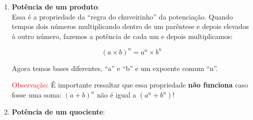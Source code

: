 \begin{enumerate}
    \begin{equation}
        a^{n^m}=(a^n)^m
    \end{equation}

    Representam a mesma coisa, mas nos diz uma ordem de execução, primeiro a potência de dentro do parêntese e depois a de fora. Continuando:

    \begin{equation}
        (a^n)^m=a^n.a^n.a^n.a^n...a^n \quad \text{, ``m'' vezes}
    \end{equation}

    E como vimos na propriedade de multiplicação de potências de mesma base, temos:

    \begin{equation}
        a^n.a^n.a^n.a^n...a^n=a^{n+n+n+n+...+n}
    \end{equation}

    Ou seja, somar os expoentes ``n'' por ``m'' vezes. Que significa calcular \(n\times m\). Por fim:

    \begin{equation}
        a^{n+n+n+n+...+n} = a^{n\times m}
    \end{equation}

    \textbf{A propriedade se resume em}:

    \begin{equation}
        (a^n)^m=a^{n\times m}
    \end{equation}

    Quando temos potência de uma potência, conservamos a base e multiplicamos os expoentes.
    
    \item \textbf{Potência de um produto}:\\

    Essa é a propriedade da ``regra do chuveirinho'' da potenciação. Quando tempos dois números multiplicando dentro de um parêntese e depois elevados à outro número, fazemos a potência de cada um e depois multiplicamos:

    \begin{equation}
        (a\times b)^n=a^n\times b^n
    \end{equation}

    Agora temos bases diferentes, ``a'' e ``b'' e um expoente comum ``n''.

    \textcolor{red}{Observação:} É importante ressaltar que essa propriedade \textbf{não funciona} caso fosse uma soma: \((a+b)^n\) não é igual a \((a^n+b^n)\)!
    \item \textbf{Potência de um quociente}:\\


\end{enumerate}
